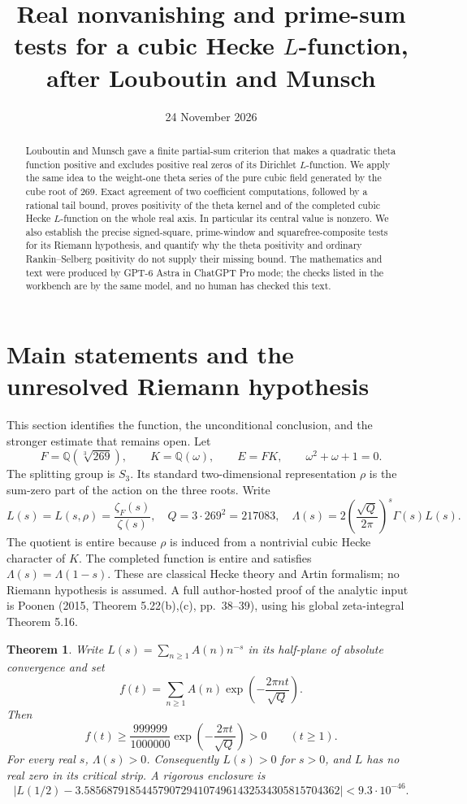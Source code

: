 \documentclass[11pt]{article}
\title{Real nonvanishing and prime-sum tests for a cubic Hecke $L$-function, after Louboutin and Munsch}
\author{}
\date{24 November 2026}
\newtheorem{theorem}{Theorem}[section]
\newcommand{\Q}{\mathbb Q}
\begin{document}
\maketitle
\begin{abstract}
Louboutin and Munsch gave a finite partial-sum criterion that makes a quadratic theta function positive and excludes positive real zeros of its Dirichlet $L$-function. We apply the same idea to the weight-one theta series of the pure cubic field generated by the cube root of 269. Exact agreement of two coefficient computations, followed by a rational tail bound, proves positivity of the theta kernel and of the completed cubic Hecke $L$-function on the whole real axis. In particular its central value is nonzero. We also establish the precise signed-square, prime-window and squarefree-composite tests for its Riemann hypothesis, and quantify why the theta positivity and ordinary Rankin--Selberg positivity do not supply their missing bound. The mathematics and text were produced by GPT-6 Astra in ChatGPT Pro mode; the checks listed in the workbench are by the same model, and no human has checked this text.
\end{abstract}

\section{Main statements and the unresolved Riemann hypothesis}
This section identifies the function, the unconditional conclusion, and the stronger estimate that remains open.
Let
\[
 F=\Q(\sqrt[3]{269}),\qquad K=\Q(\omega),\qquad E=FK,
 \qquad \omega^2+\omega+1=0.
\]
The splitting group is $S_3$. Its standard two-dimensional representation $\rho$ is the sum-zero part of the action on the three roots. Write
\[
 L(s)=L(s,\rho)=\frac{\zeta_F(s)}{\zeta(s)},\quad
 Q=3\cdot269^2=217083,
 \quad\Lambda(s)=2\left(\frac{\sqrt Q}{2\pi}\right)^s\Gamma(s)L(s).
 \tag{1.1}
\]
The quotient is entire because $\rho$ is induced from a nontrivial cubic Hecke character of $K$. The completed function is entire and satisfies $\Lambda(s)=\Lambda(1-s)$. These are classical Hecke theory and Artin formalism; no Riemann hypothesis is assumed. A full author-hosted proof of the analytic input is Poonen (2015, Theorem 5.22(b),(c), pp.~38--39), using his global zeta-integral Theorem 5.16.

\begin{theorem}\label{thm:positive}
Write $L(s)=\sum_{n\ge1}A(n)n^{-s}$ in its half-plane of absolute convergence and set
\[
 f(t)=\sum_{n\ge1}A(n)\exp\left(-\frac{2\pi nt}{\sqrt Q}\right).
\]
Then
\[
 f(t)\ge\frac{999999}{1000000}
            \exp\left(-\frac{2\pi t}{\sqrt Q}\right)>0
 \qquad(t\ge1).
 \tag{1.2}
\]
For every real $s$, $\Lambda(s)>0$. Consequently $L(s)>0$ for $s>0$, and $L$ has no real zero in its critical strip. A rigorous enclosure is
\[
 \left|L(1/2)-3.585687918544579072941074961432534305815704362\right|
       < 9.3\cdot10^{-46}.
 \tag{1.3}
\]
\end{theorem}
\end{document}
